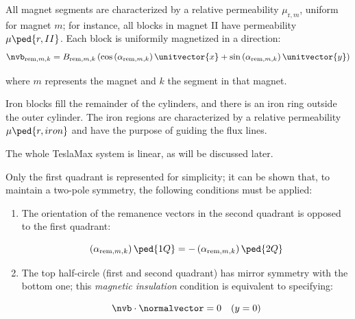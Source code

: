 \documentclass[article,brazil,english]{techreport}
\newcommand{\teslamax}{TeslaMax{ }}
\newcommand{\murm}{\mu_{\mathrm{r},m}}
\newcommand{\indexremmk}{\mathrm{rem},m,k}
\newcommand{\nvbremmk}{\nvb_{\indexremmk}}
\newcommand{\bremmk}{B_{\indexremmk}}
\newcommand{\alpharemmk}{\alpha_{\indexremmk}}
\begin{document}
All magnet segments are characterized by a relative permeability $\murm$, uniform for magnet $m$; for instance, all blocks in magnet II have permeability $\mu\ped{r,II}$. Each block is uniformily magnetized in a direction:
\begin{equation}
  \label{eq:1}
\nvbremmk = \bremmk \left( \cos\left( \alpharemmk \right) \unitvector{x} + \sin\left( \alpharemmk \right) \unitvector{y} \right)
\end{equation}

\noindent where $m$ represents the magnet and $k$ the segment in that magnet.


Iron blocks fill the remainder of the cylinders, and there is an iron ring outside the outer cylinder. The iron regions are characterized by a relative permeability $\mu\ped{r,iron}$ and have the purpose of guiding the flux lines.

The whole \teslamax system is linear, as will be discussed later.

Only the first quadrant is represented for simplicity; it can be shown that, to maintain a two-pole symmetry, the following conditions must be applied:

\begin{enumerate}
\item The orientation of the remanence vectors in the second quadrant is opposed to the first quadrant:

  \begin{equation}
    \label{eq:2}
    \left( \alpharemmk \right)\ped{1Q} = -\left( \alpharemmk \right)\ped{2Q}
  \end{equation}
\item The top half-circle (first and second quadrant) has mirror symmetry with the bottom one; this \emph{magnetic insulation} condition is equivalent to specifying:

  \begin{equation}
    \label{eq:3}
    \nvb \cdot \normalvector = 0 \quad (y = 0)
  \end{equation}
\end{enumerate}

\postextual


\end{document}
